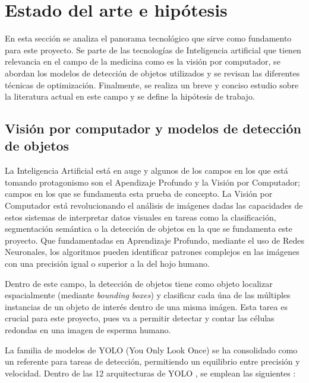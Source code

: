 \documentclass[12pt,a4paper,onecolumn,oneside]{report}
\begin{document}
\section{Estado del arte e hipótesis}
\label{sec:Estado del arte e hipótesis}

En esta sección se analiza el panorama tecnológico que sirve como fundamento para este proyecto. Se parte de las tecnologías de Inteligencia artificial que tienen relevancia en el campo de la medicina como es la 
visión por computador, se abordan los modelos de detección de objetos utilizados y se revisan las diferentes técnicas de optimización. Finalmente, se realiza un breve y conciso estudio sobre la literatura actual 
en este campo y se define la hipótesis de trabajo.

\subsection{Visión por computador y modelos de detección de objetos}

La Inteligencia Artificial está en auge y algunos de los campos en los que está tomando protagonismo son el Apendizaje Profundo y la Visión por Computador; campos en los que se fundamenta esta prueba de concepto.
La Visión por Computador está revolucionando el análisis de imágenes dadas las capacidades de estos sistemas de interpretar datos visuales en tareas como la clasificación, segmentación semántica o la detección de objetos en la que se fundamenta este proyecto.
Que fundamentadas en Aprendizaje Profundo, mediante el uso de Redes Neuronales, los algoritmos pueden identificar patrones complejos en las imágenes con una precisión igual o superior a la del hojo humano. 

Dentro de este campo, la detección de objetos tiene como objeto localizar espacialmente (mediante \textit{bounding boxes}) y clasificar cada úna de las múltiples instancias de un objeto de interés dentro de una misma imágen.
Esta tarea es crucial para este proyecto, pues va a permitir detectar y contar las células redondas en una imagen de esperma humano.

La familia de modelos de YOLO (You Only Look Once) \cite{ultralytics_models} se ha consolidado como un referente para tareas de detección, permitiendo un equilibrio entre precisión y velocidad.
Dentro de las 12 arquitecturas de YOLO \cite{ultralytics_models}, se emplean las siguientes \cite{defyolos}:
\end{document}
